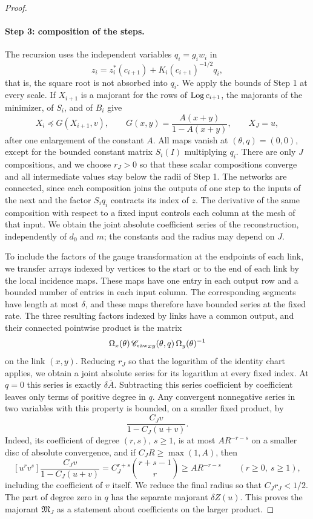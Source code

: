 \begin{proof}
\paragraph{Step 3: composition of the steps.}
The recursion uses the independent variables $q_i=g_iw_i$ in
\[
 z_i=z_i^*(c_{i+1})+K_i(c_{i+1})^{-1/2}q_i,
\]
that is, the square root is not absorbed into $q_i$. We apply the bounds of Step 1 at every scale. If $X_{i+1}$ is a majorant for the rows of $\operatorname{Log} c_{i+1}$, the majorants of the minimizer, of $S_i$, and of $B_i$ give
\[
 X_i\preccurlyeq G(X_{i+1},v),\qquad G(x,y)=\frac{A(x+y)}{1-A(x+y)},\qquad X_J=u,
\]
after one enlargement of the constant $A$. All maps vanish at $(\theta,q)=(0,0)$, except for the bounded constant matrix $S_i(I)$ multiplying $q_i$. There are only $J$ compositions, and we choose $r_J>0$ so that these scalar compositions converge and all intermediate values stay below the radii of Step 1. The networks are connected, since each composition joins the outputs of one step to the inputs of the next and the factor $S_iq_i$ contracts its index of $z$. The derivative of the same composition with respect to a fixed input controls each column at the mesh of that input. We obtain the joint absolute coefficient series of the reconstruction, independently of $d_0$ and $m$; the constants and the radius may depend on $J$.

To include the factors of the gauge transformation at the endpoints of each link, we transfer arrays indexed by vertices to the start or to the end of each link by the local incidence maps. These maps have one entry in each output row and a bounded number of entries in each input column. The corresponding segments have length at most $\delta$, and these maps therefore have bounded series at the fixed rate. The three resulting factors indexed by links have a common output, and their connected pointwise product is the matrix
\[
 \Omega_x(\theta)\,{\mathscr C_{\mathrm{raw}}}_{xy}(\theta,q)\,\Omega_y(\theta)^{-1}
\]
on the link $(x,y)$. Reducing $r_J$ so that the logarithm of the identity chart applies, we obtain a joint absolute series for its logarithm at every fixed index. At $q=0$ this series is exactly $\delta\overline A$. Subtracting this series coefficient by coefficient leaves only terms of positive degree in $q$. Any convergent nonnegative series in two variables with this property is bounded, on a smaller fixed product, by
\[
 \frac{C_Jv}{1-C_J(u+v)}.
\]
Indeed, its coefficient of degree $(r,s)$, $s\ge1$, is at most $AR^{-r-s}$ on a smaller disc of absolute convergence, and if $C_JR\ge\max(1,A)$, then
\[
 [u^rv^s]\frac{C_Jv}{1-C_J(u+v)}=C_J^{r+s}\binom{r+s-1}r\ge AR^{-r-s}\qquad(r\ge0,\ s\ge1),
\]
including the coefficient of $v$ itself. We reduce the final radius so that $C_Jr_J<1/2$. The part of degree zero in $q$ has the separate majorant $\delta Z(u)$. This proves the majorant $\mathfrak M_J$ as a statement about coefficients on the larger product.


\end{proof}
